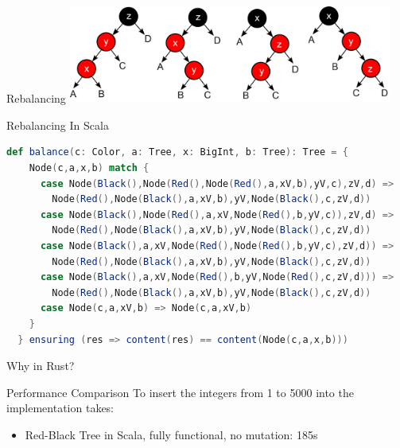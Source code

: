 \begin{frame}{Rebalancing}
  \centering
  \includegraphics[width=0.8\textwidth]{img/rbtree_cases.png}
  \vfill
\end{frame}

\begin{frame}[fragile]{Rebalancing}
In Scala
\begin{lstlisting}[language=Scala, basicstyle=\footnotesize\ttfamily,]
def balance(c: Color, a: Tree, x: BigInt, b: Tree): Tree = {
    Node(c,a,x,b) match {
      case Node(Black(),Node(Red(),Node(Red(),a,xV,b),yV,c),zV,d) =>
        Node(Red(),Node(Black(),a,xV,b),yV,Node(Black(),c,zV,d))
      case Node(Black(),Node(Red(),a,xV,Node(Red(),b,yV,c)),zV,d) =>
        Node(Red(),Node(Black(),a,xV,b),yV,Node(Black(),c,zV,d))
      case Node(Black(),a,xV,Node(Red(),Node(Red(),b,yV,c),zV,d)) =>
        Node(Red(),Node(Black(),a,xV,b),yV,Node(Black(),c,zV,d))
      case Node(Black(),a,xV,Node(Red(),b,yV,Node(Red(),c,zV,d))) =>
        Node(Red(),Node(Black(),a,xV,b),yV,Node(Black(),c,zV,d))
      case Node(c,a,xV,b) => Node(c,a,xV,b)
    }
  } ensuring (res => content(res) == content(Node(c,a,x,b)))
\end{lstlisting}
\end{frame}

\begin{frame}[standout]
  Why in Rust?
\end{frame}

\begin{frame}{Performance Comparison}
To insert the integers from 1 to 5000 into the implementation takes:
\begin{itemize}
  \item Red-Black Tree in Scala, fully functional, no mutation: 185s
\end{itemize}
\end{frame}

